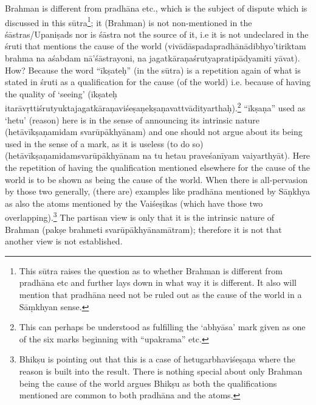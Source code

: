 \vskip 3pt


\vskip 3pt

Brahman is different from pradhāna etc.,  which is the subject of dispute which is discussed in this sūtra\footnote{This sūtra raises the question as to whether Brahman is different from pradhāna etc and further lays down in what way it is different. It also will mention that pradhāna need not be ruled out as the cause of the world in a Sāṃkhyan sense.}; it (Brahman) is not non-men\-tioned in the śāstras/Upaniṣads nor is śāstra not the source of it, i.e it is not undeclared in the śruti that mentions the cause of the world (vivādāspadapradhānādibhyo’tiriktam brahma na aśabdam nā’śāstra\-yoni, na jagatkāraṇaśrutyapratipādyamiti yāvat). How? Because the word “īkṣateḥ” (in the sūtra) is a repetition again of what is stated in śruti as a qualification for the cause (of the world) i.e. because of having the quality of ‘seeing’ (īkṣateḥ itarāvṛttiśrutyuktajagatkāraṇaviśe\-ṣaṇekṣaṇavattvādityarthaḥ).\footnote{This can perhaps be understood as fulfilling the ‘abhyāsa’ mark given as one of the six marks beginning with “upakrama” etc.} “īkṣaṇa” used as  ‘hetu’ (reason) here is in the sense of announcing its intrinsic nature (hetāvīkṣaṇamidam svarūpākhyānam) and one should not argue about its being used in the sense of a mark, as it is useless (to do so) (hetāvīkṣaṇamidamsvarūpā\-khyānam na tu hetau praveśanīyam vaiyarthyāt). Here the repetition of having the qualification mentioned elsewhere for the cause of the world is to be shown as being the cause of the world. When there is all-pervasion by those two  generally, (there are) examples like pradhāna mentioned by Sāṇkhya as also the atoms mentioned by the Vaiśeṣikas (which have those two overlapping).\footnote{Bhikṣu is pointing out that this is a case of hetugarbhaviśeṣaṇa where the reason is built into the result. There is nothing special about only Brahman being the cause of the world argues Bhikṣu as both the qualifications mentioned are common to both pradhāna and the atoms.} The partisan view is only that it is the intrinsic nature of Brahman (pakṣe brahmeti svarūpākhyānamātram); therefore it is not that another view is not established.


